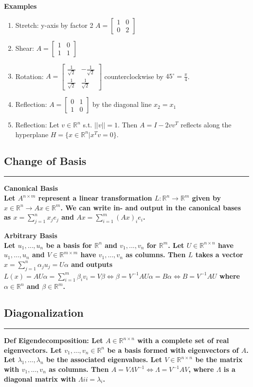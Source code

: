 \documentclass[7pt,landscape, margin = 0.1mm]{article}
\newcommand*{\mysubsection}[1]{\vspace{-2mm}\color{chaptercolor}\subsection{ #1 }
\vspace{-1mm}\hrule\vspace{1.5mm}\color{black}
\vspace{2mm}}
\newcommand{\COL}[1]{ \color{chaptercolor} \bf{#1}\color{black}     \\}
\newcommand{\DEF}[2]{\color{chaptercolor}\bf{Def #1}:\color{black}    \hspace{0.2cm} #2}
\begin{document}
\begin{multicols}{4}
\begin{flushleft}
{{\COL{Examples}}
\begin{enumerate}[nolistsep]
    \item Stretch: y-axis by factor 2 $A=\begin{bmatrix}
        1 & 0\\
        0 & 2
    \end{bmatrix}$
    \item Shear: $A=\begin{bmatrix}
        1 & 0\\
        1 & 1
    \end{bmatrix}$
    \item Rotation: $A=\begin{bmatrix}
        \frac{1}{\sqrt{2}} & -\frac{1}{\sqrt{2}}\\
        \frac{1}{\sqrt{2}} & \frac{1}{\sqrt{2}}
    \end{bmatrix}$ counterclockwise by $45^{\circ}=\frac{\pi}{4}$.
    \item Reflection: $A=\begin{bmatrix}
        0 & 1\\
        1 & 0
    \end{bmatrix}$ by the diagonal line $x_2=x_1$
    \item Reflection: Let $v\in\mathbb{R}^n$ s.t. $||v||=1$. Then $A=I-2vv^T$ reflects along the hyperplane $H=\{x\in\mathbb{R}^n|x^Tv=0\}$.
\end{enumerate}


\mysubsection{Change of Basis}
\COL{Canonical Basis}Let $A^{n\times m}$ represent a linear transformation $L:\mathbb{R}^n\rightarrow\mathbb{R}^m$ given by $x\in\mathbb{R}^n \rightarrow Ax\in\mathbb{R}^m$. We can write in- and output in the canonical bases as $x=\sum_{j=1}^nx_je_j$ and $Ax=\sum_{i=1}^m(Ax)_ie_i$.

\COL{Arbitrary Basis}Let $u_1,...,u_n$ be a basis for $\mathbb{R}^n$ and $v_1,...,v_n$ for $\mathbb{R}^m$. Let $U\in\mathbb{R}^{n\times n}$ have $u_1,...,u_n$ and $V\in\mathbb{R}^{m\times m}$ have $v_1,...,v_n$ as columns. Then $L$ takes a vector $x=\sum_{j=1}^n\alpha_ju_j=U\alpha$ and outputs $L(x)=AU\alpha=\sum_{i=1}^m\beta_iv_i=V\beta \Leftrightarrow \beta=V^{-1}AU\alpha = B\alpha \Leftrightarrow B=V^{-1}AU$ where $\alpha\in\mathbb{R}^n$ and $\beta\in\mathbb{R}^m$.

\mysubsection{Diagonalization}
\DEF{Eigendecomposition}{Let $A\in\mathbb{R}^{n\times n}$ with a complete set of real eigenvectors. Let $v_1,...,v_n\in\mathbb{R}^{n}$ be a basis formed with eigenvectors of $A$. Let $\lambda_1,...,\lambda_n$ be the associated eigenvalues. Let $V\in\mathbb{R}^{n\times n}$ be the matrix with $v_1,...,v_n$ as columns. Then $A=V\Lambda V^{-1} \Leftrightarrow \Lambda=V^{-1}AV$, where $\Lambda$ is a diagonal matrix with $\Lambda{ii}=\lambda_i$.}

}
\end{flushleft}
\end{multicols}
\end{document}
